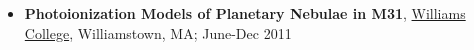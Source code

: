 \begin{itemize}
\item{\textbf{Photoionization Models of Planetary Nebulae in M31}, \href{http://physics.williams.edu}{Williams College}, Williamstown, MA; June-Dec 2011\\

}
\end{itemize}
